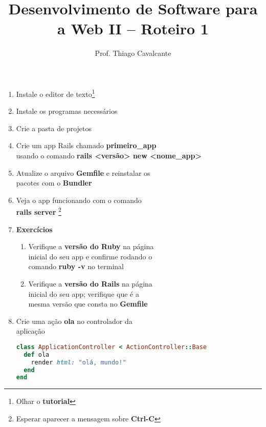 \documentclass[a4paper,12pt]{article}
\title{Desenvolvimento de Software para a Web II -- Roteiro 1}
\author{Prof. Thiago Cavalcante}
\date{}
\begin{document}
\maketitle

\begin{enumerate}
  \item Instale o editor de texto\footnote{Olhar o \textbf{tutorial}}
  \item Instale os programas necessários\footnotemark[1]
  \item Crie a pasta de projetos\footnotemark[1]
  \item Crie um app Rails chamado \textbf{primeiro\_app} \\
        usando o comando \textbf{rails <versão> new <nome\_app>}\footnotemark[1]
  \item Atualize o arquivo \textbf{Gemfile} e reinstalar os \\
        pacotes com o \textbf{Bundler}\footnotemark[1]
  \item Veja o app funcionando com o comando \\
        \textbf{rails server}%
        \footnote[7]{Esperar aparecer a mensagem sobre \textbf{Ctrl-C}}
  \item \textbf{Exercícios}

    \begin{enumerate}
      \item Verifique a \textbf{versão do Ruby} na página \\
            inicial do seu app e confirme rodando o \\
            comando \textbf{ruby -v} no terminal
      \item Verifique a \textbf{versão do Rails} na página \\
            inicial do seu app; verifique que é a \\
            mesma versão que consta no \textbf{Gemfile}
    \end{enumerate}

  \item Crie uma ação \textbf{ola} no controlador da \\
        aplicação

    \begin{lstlisting}[language=Ruby, title=app/controllers/application\_controller.rb]
class ApplicationController < ActionController::Base
  def ola
    render html: "olá, mundo!"
  end
end
    \end{lstlisting}


\end{enumerate}
\end{document}
